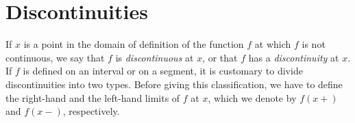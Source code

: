 \section{Discontinuities}

If $x$ is a point in the domain of definition of the function $f$ at which $f$ is not continuous, 
we say that $f$ is \emph{discontinuous} at $x$, 
or that $f$ has a \emph{discontinuity} at $x$.
If $f$ is defined on an interval or on a segment, 
it is customary to divide discontinuities into two types. 
Before giving this classification, 
we have to define the right-hand and the left-hand limits of $f$ at $x$, 
which we denote by $f(x+)$ and $f(x-)$, respectively.


